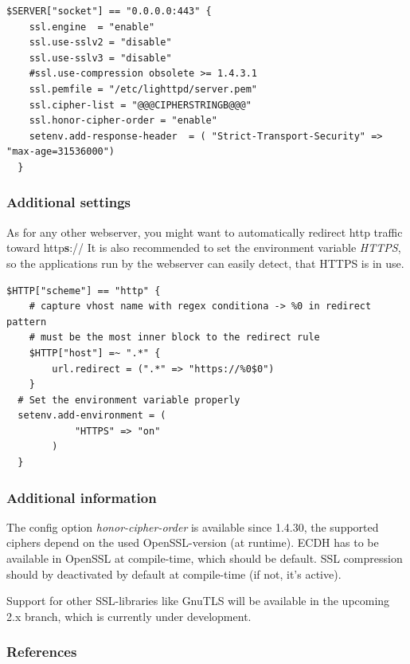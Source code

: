 
\begin{lstlisting}[breaklines]
  $SERVER["socket"] == "0.0.0.0:443" {
    ssl.engine  = "enable"
    ssl.use-sslv2 = "disable"
    ssl.use-sslv3 = "disable"
    #ssl.use-compression obsolete >= 1.4.3.1
    ssl.pemfile = "/etc/lighttpd/server.pem"
    ssl.cipher-list = "@@@CIPHERSTRINGB@@@"
    ssl.honor-cipher-order = "enable"
    setenv.add-response-header  = ( "Strict-Transport-Security" => "max-age=31536000")
  }
\end{lstlisting}


\subsubsection{Additional settings}

As for any other webserver, you might want to automatically redirect http
traffic toward http\textbf{s}:// It is also recommended to set the environment variable
\emph{HTTPS}, so the applications run by the webserver can easily detect, that
HTTPS is in use.



\begin{lstlisting}[breaklines]
  $HTTP["scheme"] == "http" {
    # capture vhost name with regex conditiona -> %0 in redirect pattern
    # must be the most inner block to the redirect rule
    $HTTP["host"] =~ ".*" {
        url.redirect = (".*" => "https://%0$0")
    }
  # Set the environment variable properly
  setenv.add-environment = (
            "HTTPS" => "on"
        )
  }
\end{lstlisting}


\subsubsection{Additional information} 
The config option \emph{honor-cipher-order} is available since 1.4.30, the
supported ciphers depend on the used OpenSSL-version (at runtime). ECDH has to
be available in OpenSSL at compile-time, which should be default. SSL
compression should by deactivated by default at compile-time (if not, it's
active).

Support for other SSL-libraries like GnuTLS will be available in the upcoming
2.x branch, which is currently under development.


\subsubsection{References} 


